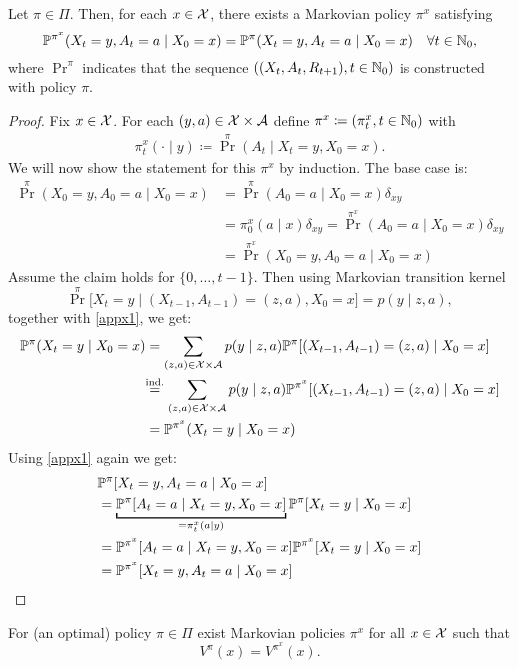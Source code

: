 \begin{prop}[Puterman]\label{prop puterman}
	Let \(\pi\in\Pi\). Then, for each \(x\in\mathcal{X}\), there exists a Markovian policy \(\pi^{x}\) satisfying
	\[\mathbb{P}^{\pi^x}(X_t=y,A_t=a\mid X_0=x)=\mathbb{P}^\pi(X_t=y,A_t=a\mid X_0=x)\quad \forall t\in\mathbb{N}_0, \]
	where \(\Pr^\pi\) indicates that the sequence 
	\(((X_t, A_t, R_{t+1}),t\in\mathbb{N}_0 )\) is constructed with policy \(\pi\).
\end{prop}
\begin{proof}
	Fix \(x\in\mathcal{X}\). For each \((y,a)\in\mathcal{X}\times\mathcal{A}\) define \(\pi^x\coloneqq (\pi^x_t,t\in\mathbb{N}_0)\) with
 	\begin{align}
			\pi^x_t(\cdot\mid y)\coloneqq \Pr^\pi (A_t \mid X_t=y,X_0=x).
	\end{align}
	We will now show the statement for this \(\pi^x\) by induction. The base case is:
	\begin{align*}
		\Pr^\pi(X_0=y,A_0=a\mid X_0=x) 
		&= \Pr^\pi(A_0=a\mid X_0=x)\delta_{xy}\\
		&=\pi^x_0(a\mid x)\delta_{xy} 
		= \Pr^{\pi^x}(A_0=a\mid X_0=x)\delta_{xy}\\
		&=\Pr^{\pi^x}(X_0=y, A_0=a\mid X_0=x)
	\end{align*}
	Assume the claim holds for \(\{0,\dots, t-1\}\). Then using Markovian transition kernel
	\[
		\Pr^\pi\big[X_t=y\mid (X_{t-1},A_{t-1})=(z,a), X_0=x\big]=p(y\mid z,a),
	\]
	together with \ref{appx1}, we get:
	\begin{align*}
		\Pr^\pi(X_t=y\mid X_0=x)
		&=\sum_{(z,a)\in\cX\times\cA}p(y\mid z,a)
		\Pr^\pi[(X_{t-1},A_{t-1})=(z,a)\mid X_0=x]\\
		&\lxeq{\text{ind.}} \sum_{(z,a)\in\cX\times\cA}p(y\mid z,a)
		\Pr^{\pi^x}[(X_{t-1},A_{t-1})=(z,a)\mid X_0=x]\\
		&=\Pr^{\pi^x}(X_t=y\mid X_0=x)
	\end{align*}
	Using \ref{appx1} again we get:
	\begin{align*}
		&\Pr^{\pi}[X_t=y, A_t=a \mid X_0=x]\\
		&=\underbracket[1pt]{\Pr^\pi[A_t=a \mid X_t=y, X_0=x]}_{=\pi^x_t(a\mid y)}
		\Pr^\pi[X_t=y\mid X_0=x]\\
		&=\Pr^{\pi^x}[A_t=a \mid X_t=y, X_0=x]\Pr^{\pi^x}[X_t=y\mid X_0=x]\\
		&=\Pr^{\pi^x}[X_t=y, A_t=a \mid X_0=x]\qedhere
	\end{align*}
\end{proof}
\begin{corollary}[Puterman]
	For (an optimal) policy \(\pi\in\Pi\) exist Markovian policies \(\pi^x\) for all \(x\in\mathcal{X}\) such that
	\[
		V^\pi(x)=V^{\pi^x}(x).
	\]
\end{corollary}
